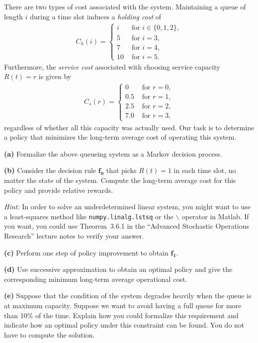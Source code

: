 \documentclass{article}
\begin{document}
\noindent
There are two types of cost associated with the system.
Maintaining a queue of length $i$ during a time slot induces a \textit{holding cost} of 
\begin{align*}
    C_h(i) = \begin{cases}
        i & \text{ for } i \in \{ 0, 1, 2 \}, \\
        5 & \text{ for } i = 3, \\
        7 & \text{ for } i = 4, \\
        10 & \text{ for } i = 5. 
    \end{cases}
\end{align*}
Furthermore, the \textit{service cost} associated with choosing service capacity $R(t) = r$ is given by
\begin{align*}
    C_s(r) = \begin{cases}
        0 & \text{ for } r = 0 , \\
        0.5 & \text{ for } r = 1 , \\
        2.5 & \text{ for } r = 2 , \\
        7.0 & \text{ for } r = 3 ,
    \end{cases}
\end{align*}
regardless of whether all this capacity was actually used.
Our task is to determine a policy that minimizes the long-term average cost of operating this system.

\vspace{1em}
\noindent
\textbf{(a)}
Formalize the above queueing system as a Markov decision process.

\vspace{1em}
\noindent
\textbf{(b)}
Consider the decision rule $\mathbf{f_0}$ that picks $R(t) = 1$ in each time slot, no matter the state of the system.
Compute the long-term average cost for this policy and provide relative rewards.

\vspace{0.2em}
\noindent
\textit{Hint:} In order to solve an underdetermined linear system, you might want to use a least-squares method like \texttt{numpy.linalg.lstsq} or the $\backslash$ operator in Matlab.
If you want, you could use Theorem~3.6.1 in the ``Advanced Stochastic Operations Research'' lecture notes to verify your answer.

\vspace{1em}
\noindent
\textbf{(c)}
Perform one step of policy improvement to obtain $\mathbf{f_1}$.

\vspace{1em}
\noindent
\textbf{(d)}
Use successive approximation to obtain an optimal policy and give the corresponding minimum long-term average operational cost.

\vspace{1em}
\noindent
\textbf{(e)}
Suppose that the condition of the system degrades heavily when the queue is at maximum capacity.
Suppose we want to avoid having a full queue for more than 10\% of the time.
Explain how you could formalize this requirement and indicate how an optimal policy under this constraint can be found.
You do not have to compute the solution.
\end{document}
